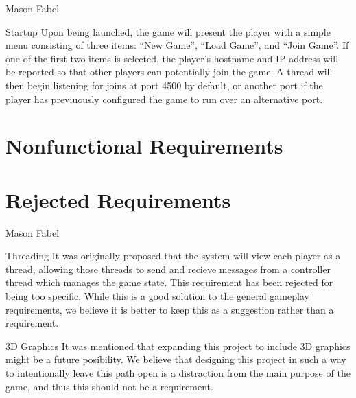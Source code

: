 \documentclass[12pt]{report}
\begin{document}
\begin{section}{Mason Fabel}
\begin{subsection}{Startup}
Upon being launched, the game will present the player with a simple menu
consisting of three items: ``New Game'', ``Load Game'', and ``Join Game''.
If one of the first two items is selected, the player's hostname and IP
address will be reported so that other players can potentially join the
game. A thread will then begin listening for joins at port 4500 by default,
or another port if the player has previuously configured the game to run
over an alternative port.
\end{subsection}
\end{section}

\chapter{Nonfunctional Requirements}

\chapter{Rejected Requirements}

\begin{section}{Mason Fabel}
\begin{subsection}{Threading}
It was originally proposed that the system will view each player as a
thread, allowing those threads to send and recieve messages from a
controller thread which manages the game state. This requirement has been
rejected for being too specific. While this is a good solution to the
general gameplay requirements, we believe it is better to keep this as a
suggestion rather than a requirement.
\end{subsection}

\begin{subsection}{3D Graphics}
It was mentioned that expanding this project to include 3D graphics might
be a future posibility. We believe that designing this project in such a
way to intentionally leave this path open is a distraction from the main
purpose of the game, and thus this should not be a requirement.
\end{subsection}
\end{section}
\end{document}
